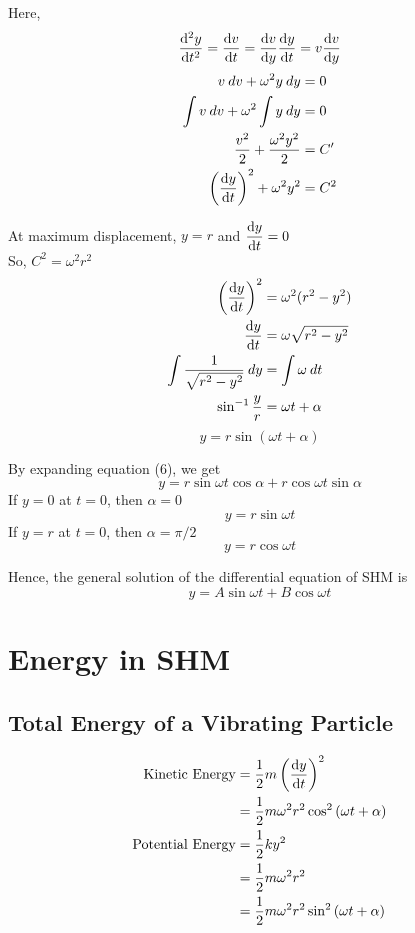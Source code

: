 \documentclass[12pt]{article}
\begin{document}
Here, \[
    \dv[2]{y}{t} = \dv{v}{t} = \dv{v}{y} \dv{y}{t} = v \dv{v}{y}
\]
\begin{align*}
    v \: d{v} + \omega^2y \: d{y} &= 0 \\
    \int{v} \: d{v} + \omega^2 \int{y} \: d{y} &= 0 \\
    \frac{v^2}{2} + \frac{\omega^2 y^2}{2} &= C' \\
    \left( \dv{y}{t} \right) ^2 + \omega^2 y^2 &= C^2
\end{align*}

At maximum displacement, $y = r$ and $\displaystyle \dv{y}{t} = 0$ \\
So, $C^2 = \omega^2 r^2$ \\
\begin{align*}
    \left( \dv{y}{t} \right)^2 &= \omega^2(r^2 - y^2) \\
    \dv{y}{t} &= \omega \sqrt{r^2 - y^2} \\
    \int{\frac{1}{\sqrt{r^2-y^2}}} \: d{y} &= \int{\omega} \: d{t} \\
    \sin^{-1}{\frac{y}{r}} &= \omega t + \alpha
\end{align*}
\begin{equation}
    \boxed{ y = r \sin{(\omega t + \alpha)} }
\end{equation}

By expanding equation (6), we get
\begin{equation}
    y = r \sin{\omega t} \cos{\alpha} + r \cos{\omega t} \sin{\alpha}
\end{equation}
If $y = 0$ at $t = 0$, then $\alpha = 0$ \\
\begin{equation}
    y = r \sin{\omega t}
\end{equation}
If $y = r$ at $t = 0$, then $\alpha = \pi/2$ \\
\begin{equation}
    y = r \cos{\omega t}
\end{equation}

Hence, the general solution of the differential equation of SHM is
\begin{equation}
    \boxed{ y = A \sin{\omega t} + B \cos{\omega t} }
\end{equation}

\section{Energy in SHM}
\subsection{Total Energy of a Vibrating Particle}
\begin{align*}
    \text{Kinetic Energy} &= \frac{1}{2} m \left( \dv{y}{t} \right)^2 \\
    &= \frac{1}{2} m \omega^2 r^2 \cos^2{(\omega t + \alpha)} \\
    \text{Potential Energy} &= \frac{1}{2} k y^2 \\
    &= \frac{1}{2} m \omega^2 r^2 \\
    &= \frac{1}{2} m \omega^2 r^2 \sin^2{(\omega t + \alpha)}
\end{align*}
\end{document}
